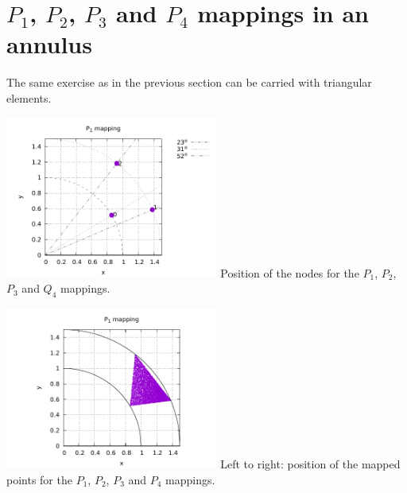 \section{$P_1$, $P_2$, $P_3$ and $P_4$ mappings in an annulus }

The same exercise as in the previous section can be carried with 
triangular elements.


\begin{center}
\includegraphics[width=7cm]{images/mappings/curved_triangles/nodesP1.pdf}
{\captionfont Position of the nodes for the $P_1$, $P_2$, $P_3$ and $Q_4$ mappings.}
\end{center}


\begin{center}
\includegraphics[width=7cm]{images/mappings/curved_triangles/xy1_volume.pdf}
{\captionfont Left to right: position of the mapped points for the $P_1$, $P_2$, $P_3$ 
and $P_4$ mappings.}
\end{center}





















